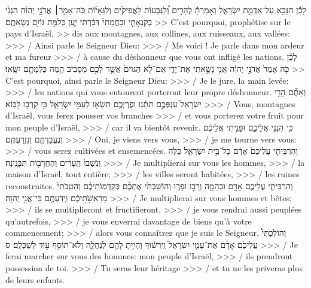 \begin{paracol}[1]
  \verseSpace
  \verset
  {לָכֵ֕ן הִנָּבֵ֖א עַל־אַדְמַ֣ת יִשְׂרָאֵ֑ל
    וְאָמַרְתָּ֡ לֶהָרִ֣ים וְ֠לַגְּבָעוֹת לָאֲפִיקִ֙ים וְלַגֵּאָי֜וֹת
    כֹּֽה־אָמַ֣ר׀ אֲדֹנָ֣י יְהוִ֗ה
    הִנְנִ֙י בְקִנְאָתִ֤י וּבַחֲמָתִי֙ דִּבַּ֔רְתִּי
    יַ֛עַן כְּלִמַּ֥ת גּוֹיִ֖ם נְשָׂאתֶֽם׃}
  {>> C’est pourquoi, prophétise sur le pays d’Israël,
    >> dis aux montagnes, aux collines, aux ruisseaux, aux vallées:
    >>> / Ainsi parle le Seigneur Dieu:
    >>> / Me voici ! Je parle dans mon ardeur et ma fureur
    >>> / à cause du déshonneur que vous ont infligé les nations.}
  \verset
  {לָכֵ֗ן כֹּ֤ה אָמַר֙ אֲדֹנָ֣י יְהוִ֔ה
    אֲנִ֖י נָשָׂ֣אתִי אֶת־יָדִ֑י
    אִם־לֹ֤א הַגּוֹיִם֙ אֲשֶׁ֣ר לָכֶ֣ם מִסָּבִ֔יב הֵ֖מָּה כְּלִמָּתָ֥ם יִשָּֽׂאוּ׃}
  {>> C’est pourquoi, ainsi parle le Seigneur Dieu:
    >>> / Je le jure, la main levée:
    >>> / les nations qui vous entourent porteront leur propre déshonneur.}
  \verseSpace
  \verset
  {וְאַתֶּ֞ם הָרֵ֤י יִשְׂרָאֵל֙ עַנְפְּכֶ֣ם תִּתֵּ֔נוּ
    וּפֶרְיְכֶ֥ם תִּשְׂא֖וּ לְעַמִּ֣י יִשְׂרָאֵ֑ל
    כִּ֥י קֵרְב֖וּ לָבֽוֹא׃}
  {>>> / Vous, montagnes d’Israël, vous ferez pousser vos branches
    >>> / et vous porterez votre fruit pour mon peuple d’Israël,
    >>> / car il va bientôt revenir.}
  \verset
  {כִּ֖י הִנְנִ֣י אֲלֵיכֶ֑ם
    וּפָנִ֣יתִי אֲלֵיכֶ֔ם
    וְנֶעֱבַדְתֶּ֖ם וְנִזְרַעְתֶּֽם׃}
  {>>> / Oui, je viens vers vous,
    >>> / je me tourne vers vous:
    >>> / vous serez cultivées et ensemencées.}
  \verset
  {וְהִרְבֵּיתִ֤י עֲלֵיכֶם֙ אָדָ֔ם
    כָּל־בֵּ֥ית יִשְׂרָאֵ֖ל כֻּלֹּ֑ה
    וְנֹֽשְׁבוּ֙ הֶֽעָרִ֔ים
    וְהֶחֳרָב֖וֹת תִּבָּנֶֽינָה׃}
  {>>> / Je multiplierai sur vous les hommes,
    >>> / la maison d’Israël, tout entière;
    >>> / les villes seront habitées,
    >>> / les ruines reconstruites.}
  \verset
  {וְהִרְבֵּיתִ֧י עֲלֵיכֶ֛ם אָדָ֥ם וּבְהֵמָ֖ה
    וְרָב֣וּ וּפָר֑וּ
    וְהוֹשַׁבְתִּ֙י אֶתְכֶ֜ם כְּקַדְמֽוֹתֵיכֶ֗ם
    וְהֵטִֽבֹתִי֙ מֵרִאשֹׁ֣תֵיכֶ֔ם
    וִֽידַעְתֶּ֖ם כִּֽי־אֲנִ֥י יְהוָֽה׃}
  {>>> / Je multiplierai sur vous hommes et bêtes;
    >>> / ils se multiplieront et fructifieront,
    >>> / je vous rendrai aussi peuplées qu’autrefois,
    >>> / je vous enverrai davantage de biens qu’à votre commencement;
    >>> / alors vous connaîtrez que je suis le Seigneur.}
  \verset
  {וְהוֹלַכְתִּי֩ עֲלֵיכֶ֙ם אָדָ֜ם אֶת־עַמִּ֤י יִשְׂרָאֵל֙
    וִֽירֵשׁ֔וּךָ
    וְהָיִ֥יתָ לָהֶ֖ם לְנַחֲלָ֑ה
    וְלֹא־תוֹסִ֥ף ע֖וֹד לְשַׁכְּלָֽם׃ ס}
  {>>> / Je ferai marcher sur vous des hommes: mon peuple d’Israël,
    >>> / ils prendront possession de toi.
    >>> / Tu seras leur héritage
    >>> / et tu ne les priveras plus de leurs enfants.}
  \parSpace

\end{paracol}
